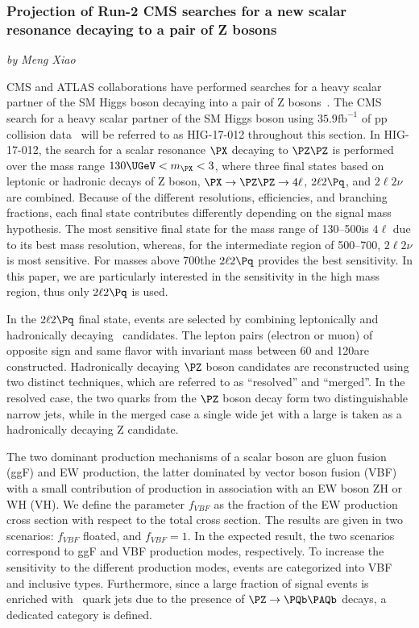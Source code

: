 \subsubsection{Projection of Run-2 CMS searches for a new scalar resonance decaying to a pair of Z bosons}
\begin{center}
 {\it{ by Meng Xiao}}
\end{center}

CMS and ATLAS collaborations have performed searches for a heavy scalar partner of the SM Higgs boson decaying into a pair of Z bosons~\cite{Aaboud:2018bun,Sirunyan:2018qlb}. The CMS search for a heavy scalar partner of the SM Higgs boson using $35.9 \mathrm{fb}^{-1}$ of pp collision data~\cite{Sirunyan:2018qlb} will be referred to as HIG-17-012 throughout this section. In HIG-17-012, the search for a scalar resonance $\PX$ decaying to $\PZ \PZ$ is performed over the mass range $130\UGeV < m_{\PX} < 3$\UTeV, where three final states based on leptonic or hadronic decays of Z boson, $\PX\to \PZ\PZ\to 4\ell$, $2\ell2\Pq$, and $2\ell2\nu$ are combined. Because of the different resolutions, efficiencies, and branching fractions, each final state contributes differently depending on the signal mass hypothesis. The most sensitive final state for the mass range of 130--500\UGeV is $4\ell$ due to its best mass resolution, whereas, for the intermediate region of 500--700\UGeV, $2\ell2\nu$ is most sensitive. For masses above 700\UGeV the $2\ell2\Pq$ provides the best sensitivity. In this paper, we are particularly interested in the sensitivity in the high mass region, thus only $2\ell2\Pq$ is used. 

In the $2\ell2\Pq$ final state, events are selected by combining leptonically
and hadronically decaying \PZ\ candidates. The lepton pairs (electron or muon) of opposite sign and same flavor 
with invariant mass between 60 and 120\UGeV are constructed.
Hadronically decaying $\PZ$ boson candidates are reconstructed using two distinct
techniques, which are referred to as ``resolved'' and ``merged''.
In the resolved case, the two quarks from the $\PZ$ boson decay form two distinguishable narrow jets, while in the merged case a single wide jet with a large \pt is taken as a hadronically decaying Z candidate.

The two dominant production mechanisms of a scalar boson are gluon fusion (ggF) and EW production, the latter dominated by vector boson fusion (VBF) with a small contribution of
production in association with an EW boson ZH or WH (VH). We define the parameter $f_{VBF}$ as the fraction of the EW production cross section with respect to the total cross section. The results are given in two scenarios: $f_{VBF}$ floated, and $f_{VBF}=1$. In the expected result, the two scenarios correspond to ggF and VBF production modes, respectively. To increase the sensitivity to the different production modes, events are categorized into VBF and inclusive types. Furthermore, since a large fraction of signal events is enriched with \PQb\ quark jets due to the presence of $\PZ\to\PQb\PAQb$ decays, a dedicated category is defined.

